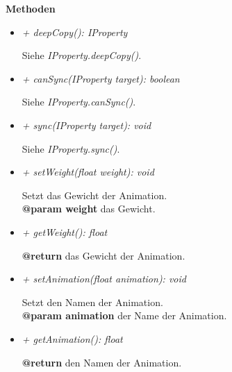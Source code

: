             \textbf{Methoden}
            \begin{itemize}
                \item \textit{+ deepCopy(): IProperty}
                    \begin{leftbar}[0.9\linewidth]
                        Siehe \textit{IProperty.deepCopy()}.
                    \end{leftbar}
                
                \pagebreak
                \item \textit{+ canSync(IProperty target): boolean}
                    \begin{leftbar}[0.9\linewidth]
                        Siehe \textit{IProperty.canSync()}.
                    \end{leftbar}
                \item \textit{+ sync(IProperty target): void}
                    \begin{leftbar}[0.9\linewidth]
                        Siehe \textit{IProperty.sync()}.
                    \end{leftbar}
                \item \textit{+ setWeight(float weight): void}
                    \begin{leftbar}[0.9\linewidth]
                        Setzt das Gewicht der Animation.\\
                        \textbf{@param weight} das Gewicht.
                    \end{leftbar}
                \item \textit{+ getWeight(): float}
                    \begin{leftbar}[0.9\linewidth]
                        \textbf{@return} das Gewicht der Animation.
                    \end{leftbar}
                \item \textit{+ setAnimation(float animation): void}
                    \begin{leftbar}[0.9\linewidth]
                        Setzt den Namen der Animation.\\
                        \textbf{@param animation} der Name der Animation.
                    \end{leftbar}
                \item \textit{+ getAnimation(): float}
                    \begin{leftbar}[0.9\linewidth]
                        \textbf{@return} den Namen der Animation.
                    \end{leftbar}
            \end{itemize}

